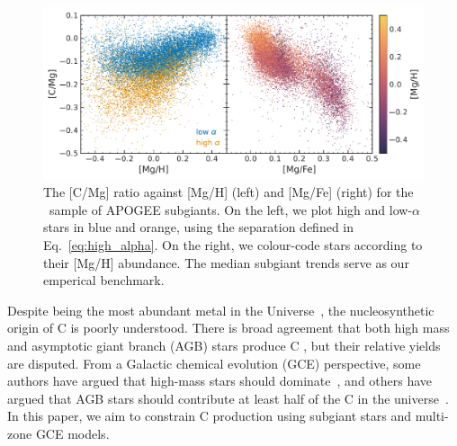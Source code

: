 \documentclass[fleqn,
usenatbib]{mnras}
\newcommand{\apogee}{APOGEE}
\newcommand{\dbstrike}[1]{{\color{Thistle} \sout{#1} }}
\newcommand{\dbadd}[1]{{\color{Thistle} #1}}
\newcommand{\dbnote}[1]{ {\color{Thistle} \textit{\small (DB: #1)}} }
\begin{document}
\begin{figure}
    \centering
    \includegraphics{subgiants.pdf}
    \caption{The [C/Mg] ratio against [Mg/H] (left) and [Mg/Fe] (right) for the \citet{jack}~sample of \apogee{} subgiants. On the left, we plot high and low-$\alpha$ stars in blue and orange, using the separation defined in Eq.~\ref{eq:high_alpha}.  On the right, we colour-code stars according to their [Mg/H] abundance. The median subgiant trends serve as our emperical benchmark. } \label{fig:subgiants}
\end{figure}



Despite being the most abundant metal in the Universe~\citep[e.g.][]{magg+22}, the nucleosynthetic origin of C is poorly understood. 
There is broad agreement that both high mass and asymptotic giant branch (AGB) stars produce C \citep{jennifer19}, but their relative yields are disputed.
From a Galactic chemical evolution (GCE) perspective, some authors have argued that high-mass stars should dominate~\citep[e.g.][]{prantzos+94, HEK00, romano+20, franchini+20, gustafsson22}, and others have argued that AGB stars should contribute at least half of the C in the universe~\citep[e.g.][]{tinsley79, chiappini+03, mattsson10, KKU11, rybizki+17, KKL20}. 
In this paper, we aim to constrain C production using subgiant stars and multi-zone GCE models.%

\end{document}
